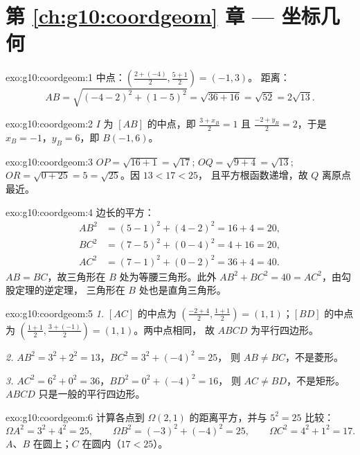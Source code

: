 \section*{第 \ref{ch:g10:coordgeom} 章 --- 坐标几何}

\begin{solution}{exo:g10:coordgeom:1}
中点：$\left(\frac{2 + (-4)}{2}, \frac{5 + 1}{2}\right) = (-1, 3)$。
距离：
\[
AB = \sqrt{(-4 - 2)^2 + (1 - 5)^2} = \sqrt{36 + 16} = \sqrt{52}
= 2\sqrt{13}.
\]
\end{solution}

\begin{solution}{exo:g10:coordgeom:2}
$I$ 为 $[AB]$ 的中点，即 $\frac{3 + x_B}{2} = 1$ 且
$\frac{-2 + y_B}{2} = 2$，于是 $x_B = -1$，$y_B = 6$，即 $B(-1, 6)$。
\end{solution}

\begin{solution}{exo:g10:coordgeom:3}
$OP = \sqrt{16 + 1} = \sqrt{17}$; $OQ = \sqrt{9 + 4} = \sqrt{13}$;
$OR = \sqrt{0 + 25} = 5 = \sqrt{25}$。因 $13 < 17 < 25$，
且平方根函数递增，故 $Q$ 离原点最近。
\end{solution}

\begin{solution}{exo:g10:coordgeom:4}
边长的平方：
\begin{align*}
AB^2 &= (5-1)^2 + (4-2)^2 = 16 + 4 = 20, \\
BC^2 &= (7-5)^2 + (0-4)^2 = 4 + 16 = 20, \\
AC^2 &= (7-1)^2 + (0-2)^2 = 36 + 4 = 40 .
\end{align*}
$AB = BC$，故三角形在 $B$ 处为等腰三角形。此外
$AB^2 + BC^2 = 40 = AC^2$，由勾股定理的逆定理，
三角形在 $B$ 处也是直角三角形。
\end{solution}

\begin{solution}{exo:g10:coordgeom:5}
\emph{1.} $[AC]$ 的中点为
$\left(\frac{-2+4}{2}, \frac{1+1}{2}\right) = (1, 1)$；$[BD]$ 的中点为
$\left(\frac{1+1}{2}, \frac{3+(-1)}{2}\right) = (1, 1)$。两中点相同，
故 $ABCD$ 为平行四边形。

\emph{2.} $AB^2 = 3^2 + 2^2 = 13$，$BC^2 = 3^2 + (-4)^2 = 25$，
则 $AB \neq BC$，不是菱形。

\emph{3.} $AC^2 = 6^2 + 0^2 = 36$，$BD^2 = 0^2 + (-4)^2 = 16$，
则 $AC \neq BD$，不是矩形。$ABCD$ 只是一般的平行四边形。
\end{solution}

\begin{solution}{exo:g10:coordgeom:6}
计算各点到 $\Omega(2,1)$ 的距离平方，并与 $5^2 = 25$ 比较：
\[
\Omega A^2 = 3^2 + 4^2 = 25, \qquad
\Omega B^2 = (-3)^2 + (-4)^2 = 25, \qquad
\Omega C^2 = 4^2 + 1^2 = 17 .
\]
$A$、$B$ 在圆上；$C$ 在圆内（$17 < 25$）。
\end{solution}

